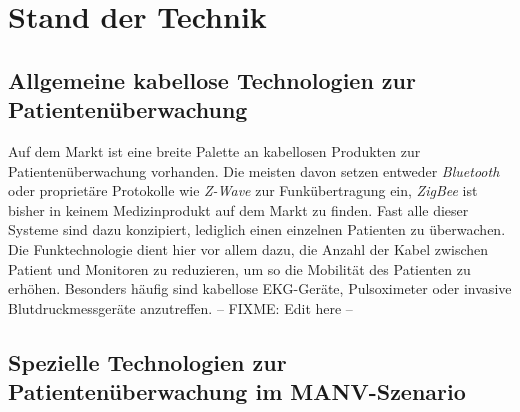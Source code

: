 
\chapter{Stand der Technik}\label{Stand der Technik}

\section{Allgemeine kabellose Technologien zur Patientenüberwachung}
Auf dem Markt ist eine breite Palette an kabellosen Produkten zur Patientenüberwachung vorhanden. Die meisten davon setzen
entweder \emph{Bluetooth} oder proprietäre Protokolle wie \emph{Z-Wave} zur Funkübertragung ein, \emph{ZigBee} ist bisher in
keinem Medizinprodukt auf dem Markt zu finden. Fast alle dieser Systeme sind dazu konzipiert, lediglich einen einzelnen 
Patienten zu überwachen. Die Funktechnologie dient hier vor allem dazu, die Anzahl der Kabel zwischen Patient und Monitoren 
zu reduzieren, um so die Mobilität des Patienten zu erhöhen. Besonders häufig sind kabellose EKG-Geräte, Pulsoximeter oder 
invasive Blutdruckmessgeräte anzutreffen. 
-- FIXME: Edit here --

\section{Spezielle Technologien zur Patientenüberwachung im MANV-Szenario}
